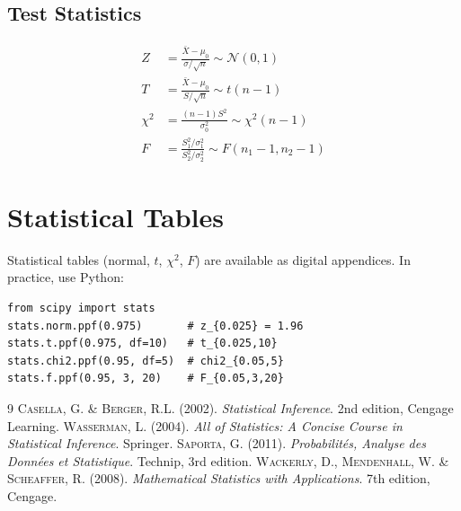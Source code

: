\documentclass[12pt,a4paper,twoside]{book}
\theoremstyle{definition}
\theoremstyle{plain}
\theoremstyle{remark}
\begin{document}
\section{Test Statistics}
\begin{align}
Z &= \frac{\bar{X}-\mu_0}{\sigma/\sqrt{n}} \sim \mathcal{N}(0,1) \\
T &= \frac{\bar{X}-\mu_0}{S/\sqrt{n}} \sim t(n-1) \\
\chi^2 &= \frac{(n-1)S^2}{\sigma_0^2} \sim \chi^2(n-1) \\
F &= \frac{S_1^2/\sigma_1^2}{S_2^2/\sigma_2^2} \sim F(n_1-1,n_2-1)
\end{align}

\chapter{Statistical Tables}
\label{app:tables}

Statistical tables (normal, $t$, $\chi^2$, $F$) are available as digital appendices. In practice, use Python:

\begin{verbatim}
from scipy import stats
stats.norm.ppf(0.975)       # z_{0.025} = 1.96
stats.t.ppf(0.975, df=10)   # t_{0.025,10}
stats.chi2.ppf(0.95, df=5)  # chi2_{0.05,5}
stats.f.ppf(0.95, 3, 20)    # F_{0.05,3,20}
\end{verbatim}


\begin{thebibliography}{9}
 \textsc{Casella}, G. \& \textsc{Berger}, R.L. (2002). \emph{Statistical Inference}. 2nd edition, Cengage Learning.
 \textsc{Wasserman}, L. (2004). \emph{All of Statistics: A Concise Course in Statistical Inference}. Springer.
 \textsc{Saporta}, G. (2011). \emph{Probabilit\'es, Analyse des Donn\'ees et Statistique}. Technip, 3rd edition.
 \textsc{Wackerly}, D., \textsc{Mendenhall}, W. \& \textsc{Scheaffer}, R. (2008). \emph{Mathematical Statistics with Applications}. 7th edition, Cengage.
\end{thebibliography}

\printindex
\end{document}
